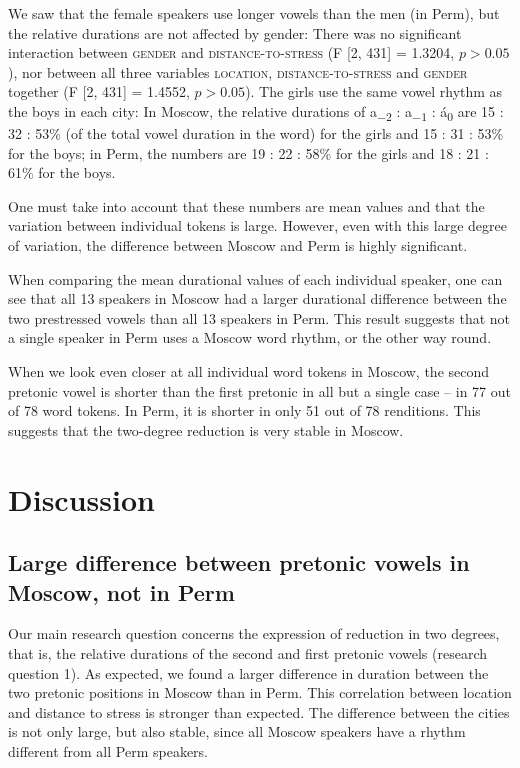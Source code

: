 \documentclass[output=paper]{langscibook}
\begin{document}
We saw that the female speakers use longer vowels than the men (in Perm), but the relative durations are not affected by gender: There was no significant interaction between \textsc{gender} and \textsc{distance-to-stress} (F [2, 431] = 1.3204, $p > 0.05$), nor between all three variables \textsc{location,} \textsc{distance-to-stress} and \textsc{gender} together (F [2, 431] = 1.4552, $p > 0.05$). The girls use the same vowel rhythm as the boys in each city: In Moscow, the relative durations of a\textsubscript{$-2$} : a\textsubscript{$-1$} : á\textsubscript{0} are 15 : 32 : 53\% (of the total vowel duration in the word) for the girls and 15 : 31 : 53\% for the boys; in Perm, the numbers are 19 : 22 : 58\% for the girls and 18 : 21 : 61\% for the boys. 



One must take into account that these numbers are mean values and that the variation between individual tokens is large. However, even with this large degree of variation, the difference between Moscow and Perm is highly significant.



When comparing the mean durational values of each individual speaker, one can see that all 13 speakers in Moscow had a larger durational difference between the two prestressed vowels than all 13 speakers in Perm. This result suggests that not a single speaker in Perm uses a Moscow word rhythm, or the other way round.



When we look even closer at all individual word tokens in Moscow, the second pretonic vowel is shorter than the first pretonic in all but a single case -- in 77 out of 78 word tokens. In Perm, it is shorter in only 51 out of 78 renditions. This suggests that the two-degree reduction is very stable in Moscow.


\section{Discussion}
\label{sec:post:4}
\subsection{Large difference between pretonic vowels in Moscow, not in Perm}
\label{sec:post:4.1}
Our main research question concerns the expression of reduction in two degrees, that is, the relative durations of the second and first pretonic vowels (research question 1). As expected, we found a larger difference in duration between the two pretonic positions in Moscow than in Perm. This correlation between location and distance to stress is stronger than expected. The difference between the cities is not only large, but also stable, since all Moscow speakers have a rhythm different from all Perm speakers. 
\end{document}
